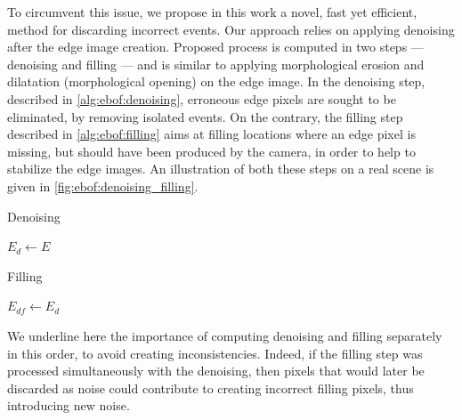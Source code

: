To circumvent this issue, we propose in this work a novel, fast yet efficient, method for discarding incorrect events. Our approach relies on applying denoising after the edge image creation. Proposed process is computed in two steps --- denoising and filling --- and is similar to applying morphological erosion and dilatation (morphological opening) on the edge image. In the denoising step, described in \cref{alg:ebof:denoising}, erroneous edge pixels are sought to be eliminated, by removing isolated events. On the contrary, the filling step described in \cref{alg:ebof:filling} aims at filling locations where an edge pixel is missing, but should have been produced by the camera, in order to help to stabilize the edge images. An illustration of both these steps on a real scene is given in \cref{fig:ebof:denoising_filling}.

\begin{algorithm}[ht]
  \caption{Denoising}\label{alg:ebof:denoising}
  \(E_d \gets E\)\;
\end{algorithm}

\begin{algorithm}[ht]
  \caption{Filling}\label{alg:ebof:filling}
  \(E_{df} \gets E_d\)\;
\end{algorithm}

We underline here the importance of computing denoising and filling separately in this order, to avoid creating inconsistencies. Indeed, if the filling step was processed simultaneously with the denoising, then pixels that would later be discarded as noise could contribute to creating incorrect filling pixels, thus introducing new noise.


